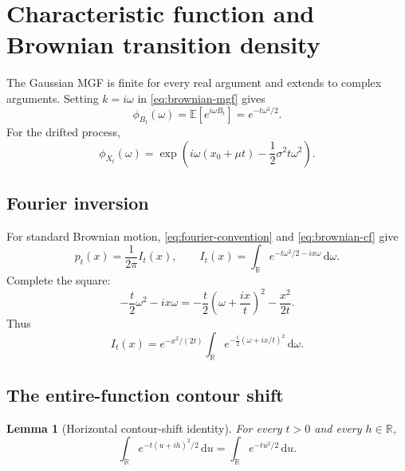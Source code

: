 \documentclass[10pt,a4paper]{article}
\numberwithin{equation}{section}
\theoremstyle{blueplain}
\newtheorem{lemma}[theorem]{Lemma}
\theoremstyle{definition}
\newcommand{\E}{\mathbb E}
\newcommand{\R}{\mathbb R}
\newcommand{\dd}{\,\mathrm d}
\begin{document}
\section{Characteristic function and Brownian transition density}

The Gaussian MGF is finite for every real argument and extends to complex
arguments.  Setting \(k=i\omega\) in \eqref{eq:brownian-mgf} gives
\begin{equation}
  \phi_{B_t}(\omega)=\E[e^{i\omega B_t}]
  =e^{-t\omega^2/2}.
  \label{eq:brownian-cf}
\end{equation}
For the drifted process,
\begin{equation}
  \phi_{X_t}(\omega)
  =\exp\!\left(
      i\omega(x_0+\mu t)-\frac12\sigma^2t\omega^2
    \right).
  \label{eq:X-cf}
\end{equation}

\subsection{Fourier inversion}

For standard Brownian motion, \eqref{eq:fourier-convention} and
\eqref{eq:brownian-cf} give
\begin{equation}
  p_t(x)=\frac1{2\pi}I_t(x),
  \qquad
  I_t(x)=\int_{\R}e^{-t\omega^2/2-i x\omega}\dd\omega.
  \label{eq:inverse-fourier}
\end{equation}
Complete the square:
\begin{equation}
  -\frac t2\omega^2-i x\omega
  =-\frac t2\left(\omega+\frac{i x}{t}\right)^2
   -\frac{x^2}{2t}.
  \label{eq:fourier-square}
\end{equation}
Thus
\begin{equation}
  I_t(x)=e^{-x^2/(2t)}
  \int_{\R}e^{-\frac t2(\omega+i x/t)^2}\dd\omega.
  \label{eq:shifted-integral}
\end{equation}

\subsection{The entire-function contour shift}

\begin{lemma}[Horizontal contour-shift identity]
For every \(t>0\) and every \(h\in\R\),
\begin{equation}
  \int_{\R}e^{-t(u+ih)^2/2}\dd u
  =\int_{\R}e^{-tu^2/2}\dd u.
  \label{eq:contour-shift}
\end{equation}
\end{lemma}
\end{document}

